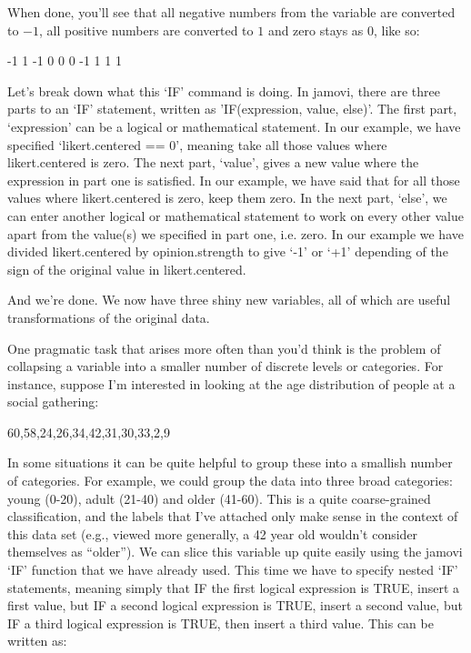 When done, you'll see that all negative numbers from the  variable are converted to $-1$, all positive numbers are converted to $1$ and zero stays as $0$, like so: 

\begin{rblock1}
-1  1 -1  0  0  0 -1  1  1  1
\end{rblock1}

Let's break down what this `IF' command is doing. In jamovi, there are three parts to an `IF' statement, written as 'IF(expression, value, else)'. The first part, `expression' can be a logical or mathematical statement. In our example, we have specified `likert.centered == 0', meaning take all those values where likert.centered is zero. The next part, `value', gives a new value where the expression in part one is satisfied. In our example, we have said that for all those values where likert.centered is zero, keep them zero. In the next part, `else', we can enter another logical or mathematical statement to work on every other value apart from the value(s) we specified in part one, i.e. zero. In our example we have divided likert.centered by opinion.strength to give `-1' or `+1' depending of the sign of the original value in likert.centered.

And we're done. We now have three shiny new variables, all of which are useful transformations of the original  data. 




One pragmatic task that arises more often than you'd think is the problem of collapsing a variable into a smaller number of discrete levels or categories. For instance, suppose I'm interested in looking at the age distribution of people at a social gathering:\\
\begin{rblock1}
60,58,24,26,34,42,31,30,33,2,9
\end{rblock1}
In some situations it can be quite helpful to group these into a smallish number of categories. For example, we could group the data into three broad categories: young (0-20), adult (21-40) and older (41-60). This is a quite coarse-grained classification, and the labels that I've attached only make sense in the context of this data set (e.g., viewed more generally, a 42 year old wouldn't consider themselves as ``older''). We can slice this variable up quite easily using the jamovi `IF' function that we have already used. This time we have to specify nested `IF' statements, meaning simply that IF the first logical expression is TRUE, insert a first value, but IF a second logical expression is TRUE, insert a second value, but IF a third logical expression is TRUE, then insert a third value. This can be written as: \\ 

